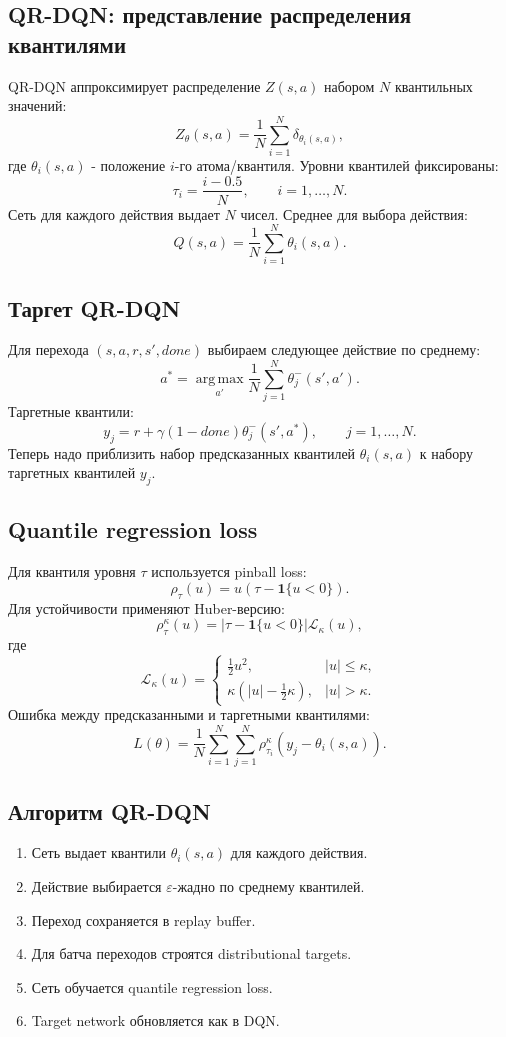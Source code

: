 \documentclass[11pt,a4paper]{article}
\newcommand{\argmax}{\operatorname*{arg\,max}}
\newcommand{\1}{\mathbf{1}}
\begin{document}
\subsection*{QR-DQN: представление распределения квантилями}
QR-DQN аппроксимирует распределение $Z(s,a)$ набором $N$ квантильных значений:
\[
    Z_\theta(s,a)=\frac1N\sum_{i=1}^N \delta_{\theta_i(s,a)},
\]
где $\theta_i(s,a)$ - положение $i$-го атома/квантиля. Уровни квантилей фиксированы:
\[
    \tau_i=\frac{i-0.5}{N},\qquad i=1,\dots,N.
\]
Сеть для каждого действия выдает $N$ чисел. Среднее для выбора действия:
\[
    Q(s,a)=\frac1N\sum_{i=1}^N \theta_i(s,a).
\]

\subsection*{Таргет QR-DQN}
Для перехода $(s,a,r,s',done)$ выбираем следующее действие по среднему:
\[
    a^*=\argmax_{a'}\frac1N\sum_{j=1}^N \theta_j^-(s',a').
\]
Таргетные квантили:
\[
    y_j=r+\gamma(1-done)\theta_j^-(s',a^*),
    \qquad j=1,\dots,N.
\]
Теперь надо приблизить набор предсказанных квантилей $\theta_i(s,a)$ к набору таргетных квантилей $y_j$.

\subsection*{Quantile regression loss}
Для квантиля уровня $\tau$ используется pinball loss:
\[
    \rho_\tau(u)=u(\tau-\1\{u<0\}).
\]
Для устойчивости применяют Huber-версию:
\[
    \rho_\tau^\kappa(u)=|\tau-\1\{u<0\}|\mathcal L_\kappa(u),
\]
где
\[
    \mathcal L_\kappa(u)=
    \begin{cases}
    \frac12u^2, & |u|\le \kappa,\\
    \kappa(|u|-\frac12\kappa), & |u|>\kappa.
    \end{cases}
\]
Ошибка между предсказанными и таргетными квантилями:
\[
    L(\theta)=\frac1N\sum_{i=1}^N\sum_{j=1}^N
    \rho_{\tau_i}^\kappa\left(y_j-\theta_i(s,a)\right).
\]

\subsection*{Алгоритм QR-DQN}
\begin{enumerate}
    \item Сеть выдает квантили $\theta_i(s,a)$ для каждого действия.
    \item Действие выбирается $\varepsilon$-жадно по среднему квантилей.
    \item Переход сохраняется в replay buffer.
    \item Для батча переходов строятся distributional targets.
    \item Сеть обучается quantile regression loss.
    \item Target network обновляется как в DQN.
\end{enumerate}
\end{document}
